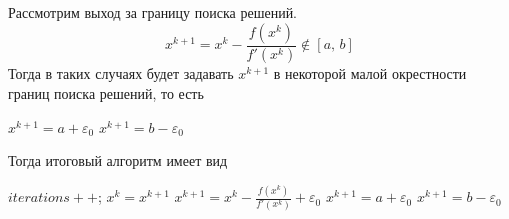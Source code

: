 \documentclass{article}
\begin{document}
\begin{enumerate}
        Рассмотрим выход за границу поиска решений. 
        \begin{equation*}
            x^{k+1} = x^k - \frac{f(x^k)}{f'(x^k)} \not \in [a,\, b]
        \end{equation*}
        Тогда в таких случаях будет задавать $x^{k+1}$ в некоторой малой окрестности границ поиска решений, то есть 
        \begin{algorithmic}[1]
            \State  $x^{k+1} = a + \varepsilon_0$
            \EndIf
            \State  $x^{k+1} = b - \varepsilon_0$
            \EndIf
                        
        \end{algorithmic}
        Тогда итоговый алгоритм имеет вид
        \begin{algorithmic}[1]
            \State $iterations++$;
            \State $x^k = x^{k+1}$
            \State $x^{k+1} = x^k - \frac{f(x^k)}{f'(x^k)} + \varepsilon_0$
            \State  $x^{k+1} = a + \varepsilon_0$
            \EndIf
            \State  $x^{k+1} = b - \varepsilon_0$
            \EndIf
            \EndWhile
        \end{algorithmic}
    \end{enumerate}
\end{document}
